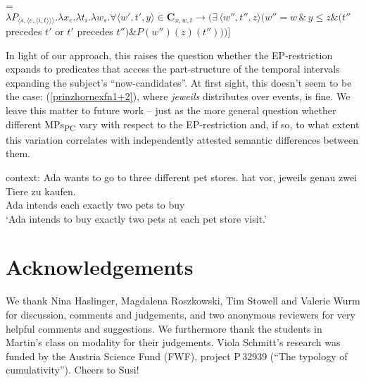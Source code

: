 \documentclass[output=paper,colorlinks,citecolor=brown,
]{langscibook}
\begin{document}
\ea {} = $\lambda P_{\langle s, \langle e, \langle i,t \rangle \rangle \rangle}. \lambda x_{e}. \lambda t_{i}. \lambda w_{s}. \forall \langle w',t',y \rangle \in \textbf{C}_{x,w,t} \rightarrow (\exists\, \langle w'', t'', z \rangle (w'' = w \, \& \, y \le z \& (t''$ precedes $t'$ or $t'$ precedes $t'') \& P(w'')(z)(t'')))]$
 \label{prinzhornhazel}\z  
 
In light of our approach, this raises the question whether the EP-restriction expands to predicates that access the part-structure of the temporal intervals expanding the subject's “now-candidates”. At first sight, this doesn't seem to be the case:   (\ref{prinzhornexfn1+2}), where \textit{jeweils} distributes over events, is fine. We leave this matter to future work -- just as the more general question  whether different MPs\textsubscript{PC} vary with respect to the EP-restriction and, if so, to what extent this variation correlates with independently attested semantic differences between them.
 
\ea \label{prinzhornexfn1+2}
\ea \label{prinzhornexfn1} {\sc context:} Ada wants to go to three different pet stores.
\ex {} {hat vor}, {jeweils} {genau} {zwei} {Tiere} {zu} {kaufen}.\\
   Ada intends {} each exactly two pets to buy \\
\glt `Ada intends to buy exactly two pets at each pet store visit.' \label{prinzhornexfn2}
\z \z

\section*{Acknowledgements}
\begin{sloppypar}
We thank Nina Haslinger, Magdalena Roszkowski, Tim Stowell and Valerie Wurm for discussion, comments and judgements, and two anonymous reviewers for very helpful comments and suggestions. We furthermore thank the students in Martin's class on modality for their judgements. Viola Schmitt's research was funded by the Austria Science Fund (FWF), project  P\,32939 (“The typology of cumulativity”). Cheers to Susi!
\end{sloppypar}

\printbibliography[heading=subbibliography,notkeyword=this]
\end{document}

